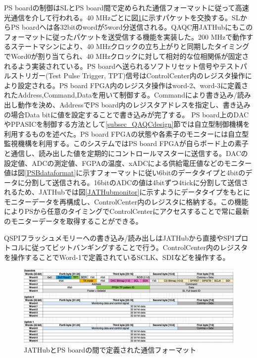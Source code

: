 PS boardの制御はSLとPS board間で定められた通信フォーマットに従って高速光通信を介して行われる。40 MHzごとに図\ref{JATHubpsbformat}に示すパケットを交換する。SLからPS boardへは各32bitのwordが5word分送信される。QAQC用JATHubにもこのフォーマットに従ったパケットを送受信する機能を実装した。200 MHzで動作するステートマシンにより、40 MHzクロックの立ち上がりと同期したタイミングでWord0が割り当てられ、40 MHzクロックに対して相対的な位相関係が固定されるよう実装されている。PS boardへ送られるソフトリセット信号やテストパルストリガー(Test Pulse Trigger, TPT)信号はControlCenter内のレジスタ操作により設定される。PS board FPGA内のレジスタ操作はword-2、word-3に定義されたAddress,Command,Dataを用いて制御する。Commandにより書き込み/読み出し動作を決め、AddressでPS board内のレジスタアドレスを指定し、書き込みの場合Data bitに値を設定することで書き込みが完了する。
PS board上のDACやPPASICを制御する方法として\ref{subsec_QAQCdesign}節では自立型制御機構を利用するものを述べた。PS board FPGAの状態や各素子のモニターには自立型監視機構を利用する。このシステムではPS board FPGAが自らボード上の素子と通信し、読み出した値を定期的にコントロールマスターに送信する。DACの設定値、ADCの測定値、FGPAの温度、xADCによる供給電圧値などのモニター値は図\ref{PSBdataformat}に示すフォーマットに従い6bitのデータタイプと4bitのデータに分割して送信される。16bitのADCの値は4bitずつ4tickに分割して送信されるため、JATHubでは図\ref{JATHubmonitor}に示すようにデータタイプをもとにモニターデータを再構成し、ControlCenter内のレジスタに格納する。この機能によりPSから任意のタイミングでControlCenterにアクセスすることで常に最新のモニターデータを取得することができる。

QSPIフラッシュメモリーへの書き込み/読み出しはJATHubから直接やSPIプロトコルに従ってビットバンギングすることで行う。ControlCenter内のレジスタを操作することでWord-1で定義されているSCLK、SDIなどを操作する。
\baselineskip

\begin{figure} 
\centering
\includegraphics[width=16cm]{fig/JATHubpsbformat.png}
\caption[JATHubとPS boardの間で定義された通信フォーマット]{JATHubとPS boardの間で定義された通信フォーマット}
\label{JATHubpsbformat}
\end{figure}

